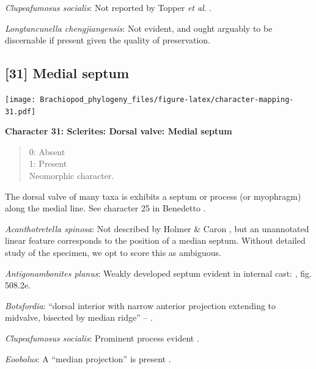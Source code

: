 \documentclass[openany]{book}
\theoremstyle{definition}
\theoremstyle{definition}
\theoremstyle{definition}
\theoremstyle{remark}
\begin{document}
\hypertarget{Clupeafumosus_socialis-coding-30}{}
\emph{Clupeafumosus socialis}: Not reported by Topper \emph{et al}.
\citeyearpar{Topper2013Reappraisalof}.

\hypertarget{Longtancunella_chengjiangensis-coding-30}{}
\emph{Longtancunella chengjiangensis}: Not evident, and ought arguably
to be discernable if present given the quality of preservation.

\subsection*{{[}31{]} Medial septum}\label{medial-septum}

\texttt{[image: Brachiopod\_phylogeny\_files/figure-latex/character-mapping-31.pdf]}

\textbf{Character 31: Sclerites: Dorsal valve: Medial septum}

\begin{quote}
0: Absent\\
1: Present\\
Neomorphic character.
\end{quote}

The dorsal valve of many taxa is exhibits a septum or process (or
myophragm) along the medial line. See character 25 in Benedetto
\citeyearpar{Benedetto2009iChaniella}.

\hypertarget{Acanthotretella_spinosa-coding-31}{}
\emph{Acanthotretella spinosa}: Not described by Holmer \& Caron
\citeyearpar{Holmer2006Aspinose}, but an unannotated linear feature
corresponds to the position of a median septum. Without detailed study
of the specimen, we opt to score this as ambiguous.

\hypertarget{Antigonambonites_planus-coding-31}{}
\emph{Antigonambonites planus}: Weakly developed septum evident in
internal cast: \citet{Williams2000LinguliformeaCraniiformea}, fig.
508.2e.

\hypertarget{Botsfordia-coding-31}{}
\emph{Botsfordia}: ``dorsal interior with narrow anterior projection
extending to midvalve, bisected by median ridge'' --
\citet{Williams2000LinguliformeaCraniiformea}.

\hypertarget{Clupeafumosus_socialis-coding-31}{}
\emph{Clupeafumosus socialis}: Prominent process evident
\citep{Topper2013Reappraisalof}.

\hypertarget{Eoobolus-coding-31}{}
\emph{Eoobolus}: A ``median projection'' is present \citep[fig. 4g
in][]{Balthasar2009Thebrachiopod}.
\end{document}
